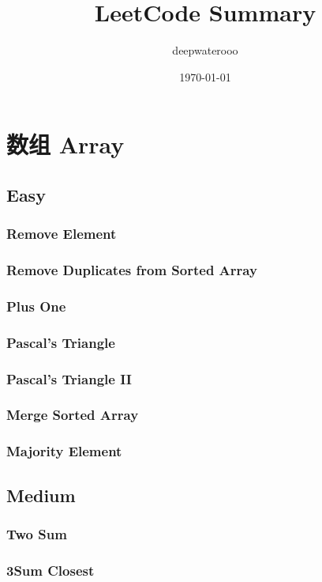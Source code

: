 \documentclass[12pt]{book}
\author{deepwaterooo}
\date{\today}
\title{LeetCode Summary}
\begin{document}
\maketitle
\tableofcontents


\chapter{数组 Array}
\label{sec-1}
\section{Easy}
\label{sec-1-1}
\subsection{Remove Element}
\label{sec-1-1-1}
\subsection{Remove Duplicates from Sorted Array}
\label{sec-1-1-2}
\subsection{Plus One}
\label{sec-1-1-3}
\subsection{Pascal's Triangle}
\label{sec-1-1-4}
\subsection{Pascal's Triangle II}
\label{sec-1-1-5}
\subsection{Merge Sorted Array}
\label{sec-1-1-6}
\subsection{Majority Element}
\label{sec-1-1-7}
\section{Medium}
\label{sec-1-2}
\subsection{Two Sum}
\label{sec-1-2-1}
\subsection{3Sum Closest}
\label{sec-1-2-2}
\end{document}
